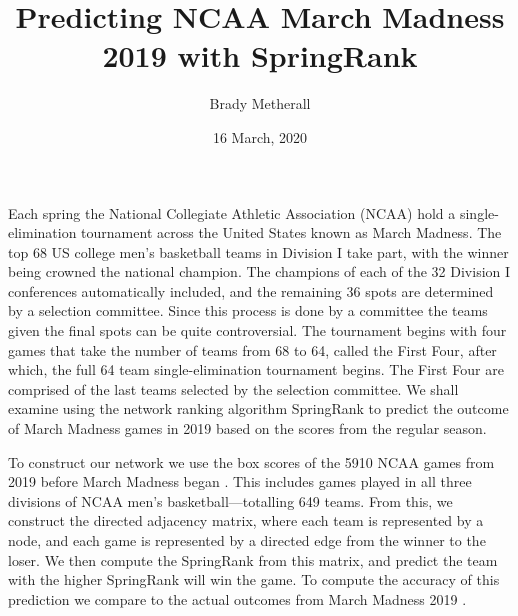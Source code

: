 \documentclass[aps,twocolumn]{revtex4-1}
\begin{document}
\title{Predicting NCAA March Madness 2019 with SpringRank}
\author{Brady Metherall}
\date{16 March, 2020}

\maketitle

Each spring the National Collegiate Athletic Association (NCAA) hold a single-elimination tournament across the United States known as March Madness. The top 68 US college men's basketball teams in Division I take part, with the winner being crowned the national champion. The champions of each of the 32 Division I conferences automatically included, and the remaining 36 spots are determined by a selection committee. Since this process is done by a committee the teams given the final spots can be quite controversial. The tournament begins with four games that take the number of teams from 68 to 64, called the First Four, after which, the full 64 team single-elimination tournament begins. The First Four are comprised of the last teams selected by the selection committee. We shall examine using the network ranking algorithm SpringRank \cite{debacco} to predict the outcome of March Madness games in 2019 based on the scores from the regular season.

To construct our network we use the box scores of the 5910 NCAA games from 2019 before March Madness began \cite{wirth}. This includes games played in all three divisions of NCAA men's basketball---totalling 649 teams. From this, we construct the directed adjacency matrix, where each team is represented by a node, and each game is represented by a directed edge from the winner to the loser. We then compute the SpringRank from this matrix, and predict the team with the higher SpringRank will win the game. To compute the accuracy of this prediction we compare to the actual outcomes from March Madness 2019 \cite{vanderkam}.
\end{document}
